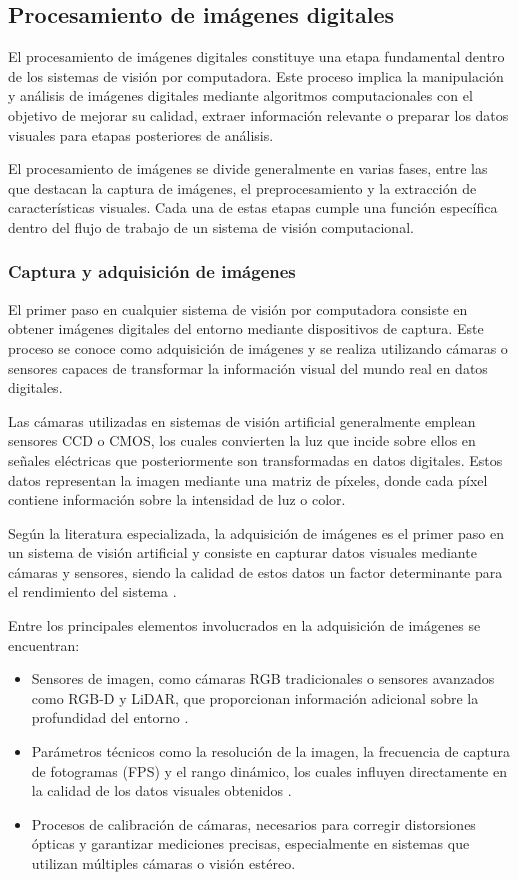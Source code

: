 \subsection{Procesamiento de imágenes digitales}
El procesamiento de imágenes digitales constituye una etapa fundamental dentro de los sistemas de visión por computadora. Este proceso implica la manipulación y análisis de imágenes digitales mediante algoritmos computacionales con el objetivo de mejorar su calidad, extraer información relevante o preparar los datos visuales para etapas posteriores de análisis.

El procesamiento de imágenes se divide generalmente en varias fases, entre las que destacan la captura de imágenes, el preprocesamiento y la extracción de características visuales. Cada una de estas etapas cumple una función específica dentro del flujo de trabajo de un sistema de visión computacional.
\subsubsection{Captura y adquisición de imágenes}
El primer paso en cualquier sistema de visión por computadora consiste en obtener imágenes digitales del entorno mediante dispositivos de captura. Este proceso se conoce como adquisición de imágenes y se realiza utilizando cámaras o sensores capaces de transformar la información visual del mundo real en datos digitales.

Las cámaras utilizadas en sistemas de visión artificial generalmente emplean sensores CCD o CMOS, los cuales convierten la luz que incide sobre ellos en señales eléctricas que posteriormente son transformadas en datos digitales. Estos datos representan la imagen mediante una matriz de píxeles, donde cada píxel contiene información sobre la intensidad de luz o color.

Según la literatura especializada, la adquisición de imágenes es el primer paso en un sistema de visión artificial y consiste en capturar datos visuales mediante cámaras y sensores, siendo la calidad de estos datos un factor determinante para el rendimiento del sistema \cite{unitxlabs_processing}.

Entre los principales elementos involucrados en la adquisición de imágenes se encuentran:
\begin{itemize}
    \item Sensores de imagen, como cámaras RGB tradicionales o sensores avanzados como RGB-D y LiDAR, que proporcionan información adicional sobre la profundidad del entorno \cite{pmc_assistive_systems}.
    \item Parámetros técnicos como la resolución de la imagen, la frecuencia de captura de fotogramas (FPS) y el rango dinámico, los cuales influyen directamente en la calidad de los datos visuales obtenidos \cite{unitxlabs_processing}\cite{unitxlabs_prepost}.
    \item Procesos de calibración de cámaras, necesarios para corregir distorsiones ópticas y garantizar mediciones precisas, especialmente en sistemas que utilizan múltiples cámaras o visión estéreo.
\end{itemize}

